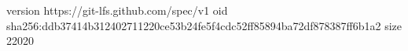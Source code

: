 version https://git-lfs.github.com/spec/v1
oid sha256:ddb37414b312402711220ce53b24fe5f4cdc52ff85894ba72df878387ff6b1a2
size 22020
